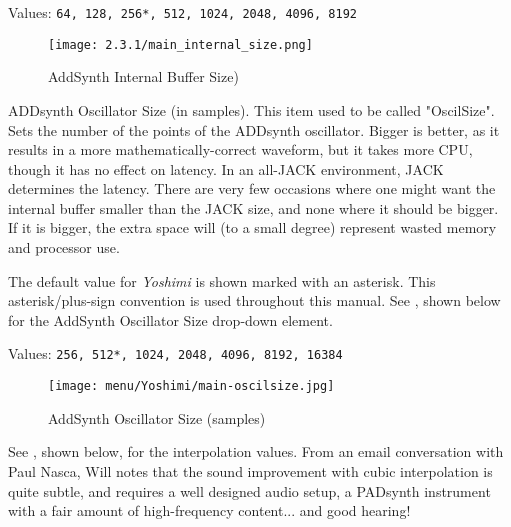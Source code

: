    Values: \texttt{64, 128, 256*, 512, 1024, 2048, 4096, 8192}

\begin{figure}[H]
   \centering
   \texttt{[image: 2.3.1/main\_internal\_size.png]}
   \caption[Internal Size Values]{AddSynth Internal Buffer Size)}
   \label{fig:yoshimi_internalsize_values}
\end{figure}

   ADDsynth Oscillator Size (in samples).  This item used to be called
   "OscilSize".  Sets the number of the points of the ADDsynth oscillator.
   Bigger is better, as it results in a more mathematically-correct waveform,
   but it takes more CPU, though it has no effect on latency.
   In an all-JACK environment, JACK determines the latency.  There are very few
   occasions where one might want the internal buffer smaller than the JACK
   size, and none where it should be bigger. If it is bigger, the extra space
   will (to a small degree) represent wasted memory and processor use.

%

   The default value for \textsl{Yoshimi} is shown marked with an asterisk.
   This asterisk/plus-sign convention is used throughout this manual.
   See ,
   shown below for the AddSynth Oscillator Size drop-down element.

   Values: \texttt{256, 512*, 1024, 2048, 4096, 8192, 16384}

\begin{figure}[H]
   \centering
   \texttt{[image: menu/Yoshimi/main-oscilsize.jpg]}
   \caption[OscilSize Values]{AddSynth Oscillator Size (samples)}
   \label{fig:yoshimi_oscilsize_values}
\end{figure}

   See , shown below,
   for the interpolation values.
   From an email conversation with Paul Nasca, Will notes that
   the sound improvement with cubic interpolation is quite subtle, and requires
   a well designed audio setup, a PADsynth instrument with a fair amount of
   high-frequency content... and good hearing!

